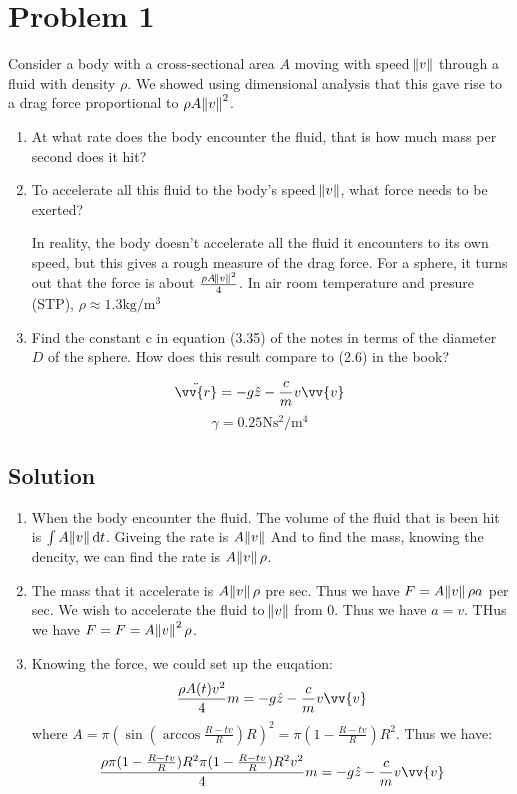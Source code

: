 \documentclass[aps,prl,reprint]{revtex4-1}
\newcommand{\de}{\mathrm{d}}
\begin{document}
\section{Problem 1}
Consider a body with a cross-sectional area $A$ moving with speed $\norm{v}$ through a fluid with density $\rho$. We showed using dimensional analysis that this gave rise to a drag force proportional to $\rho A \norm{v}^2$.
\begin{enumerate}
    \item At what rate does the body encounter the fluid, that is how much mass per second does it hit?
    \item To accelerate all this fluid to the body’s speed $\norm{v}$, what force needs to be exerted? 

    In reality, the body doesn't accelerate all the fluid it encounters to its own speed, but this gives a rough measure of the drag force. For a sphere, it turns out that the force is about $\frac{\rho A \norm{v}^2}{4}$. In air room temperature and presure (STP), $\rho \approx 1.3\si{\kilo\gram\per\cubic\metre}$
    \item Find the constant c in equation (3.35) of the notes in terms of the diameter $D$ of the sphere. How does this result compare to (2.6) in the book?
\end{enumerate}
\[
\ddot{\vv{r}} = -g\hat{z}-\frac{c}{m}v\vv{v}
\]
\[
\gamma = 0.25\si{\newton\second\squared\per\metre\tothe{4}}
\]
\subsection{Solution}
\begin{enumerate}
    \item When the body encounter the fluid. The volume of the fluid that is been hit is $\int A \norm{v} \de t$. Giveing the rate is $A\norm{v}$ And to find the mass, knowing the dencity, we can find the rate is $A\norm{v}\rho$.
    \item The mass that it accelerate is $A\norm{v}\rho$ pre sec. Thus we have $F = A\norm{v}\rho a$ per sec. We wish to accelerate the fluid to $\norm{v}$ from $0$. Thus we have $a = v$. THus we have $F = F = A\norm{v}^2\rho$.
    \item Knowing the force, we could set up the euqation:
    \[
    \frac{\rho A(t) v^2}{4}m = -g\hat{z}-\frac{c}{m}v\vv{v}
    \]
    where $A = \pi (\sin(\arccos\frac{R-tv}{R})R)^2 = \pi (1-\frac{R-tv}{R})R^2$. Thus we have:
    \[
    \frac{\rho\pi (1-\frac{R-tv}{R})R^2\pi (1-\frac{R-tv}{R})R^2 v^2}{4}m = -g\hat{z}-\frac{c}{m}v\vv{v}
    \]
\end{enumerate}
\end{document}
